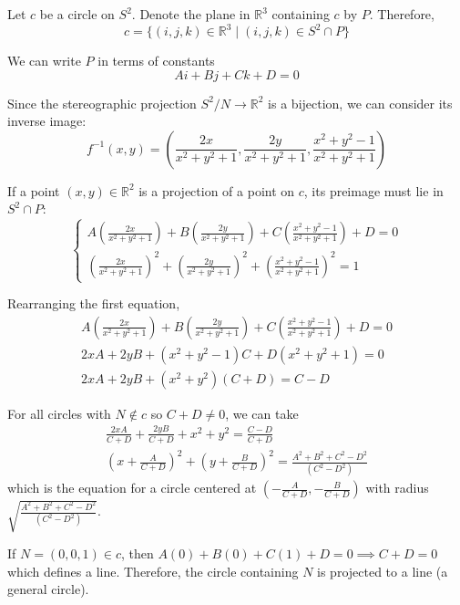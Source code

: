 \documentclass[12pt]{article}
\newcommand{\R}{\mathbb{R}}
\begin{document}
    \color{blue}
        Let $c$ be a circle on $S^2$. Denote the plane in $\R^3$ containing $c$ by $P$. Therefore, 
        \[c = \{(i, j, k) \in \R^3 \; | \; (i, j, k) \in S^2 \cap P\}\]

        We can write $P$ in terms of constants 
        \[Ai + Bj + Ck + D = 0\]

        Since the stereographic projection $S^2/N \to \R^2$ is a bijection, we can consider its inverse image: 
        \[f^{-1}(x, y) = \left(\frac{2x}{x^2 + y^2 + 1}, \frac{2y}{x^2 + y^2 + 1}, \frac{x^2 + y^2 - 1}{x^2 + y^2 + 1}\right)\] 

        If a point $(x, y) \in \R^2$ is a projection of a point on $c$, its preimage must lie in $S^2 \cap P$: 
        \[\begin{cases}
            A\left(\frac{2x}{x^2 + y^2 + 1}\right) + B\left(\frac{2y}{x^2 + y^2 + 1}\right) + C\left(\frac{x^2 + y^2 - 1}{x^2 + y^2 + 1}\right) + D =0\\ 
            \left(\frac{2x}{x^2 + y^2 + 1}\right)^2 + \left(\frac{2y}{x^2 + y^2 + 1}\right)^2 + \left(\frac{x^2 + y^2 - 1}{x^2 + y^2 + 1}\right)^2 = 1
        \end{cases}\]

        Rearranging the first equation,
        \begin{gather*}
            A\left(\frac{2x}{x^2 + y^2 + 1}\right) + B\left(\frac{2y}{x^2 + y^2 + 1}\right) + C\left(\frac{x^2 + y^2 - 1}{x^2 + y^2 + 1}\right) + D =0\\ 
            2xA + 2yB + (x^2 + y^2 - 1)C + D(x^2 + y^2 + 1) = 0\\
            2xA + 2yB + (x^2 + y^2)(C + D) = C - D
        \end{gather*}

        For all circles with $N \notin c$ so $C + D \neq 0$, we can take 
        \begin{gather*}
            \frac{2xA}{C + D} + \frac{2yB}{C + D} + x^2 + y^2 = \frac{C - D}{C + D}\\ 
            \left(x + \frac{A}{C + D}\right)^2 + \left(y + \frac{B}{C  +D}\right)^2 = \frac{A^2 + B^2 + C^2 - D^2}{(C^2 - D^2)}
        \end{gather*}
        which is the equation for a circle centered at $\left(-\frac{A}{C + D}, -\frac{B}{C + D}\right)$ with radius $\sqrt{\frac{A^2 + B^2 + C^2 - D^2}{(C^2 - D^2)}}$.

        If $N = (0, 0, 1) \in c$, then $A(0) + B(0) + C(1) + D = 0 \implies C + D = 0$ which defines a line. Therefore, the circle containing $N$ is projected to a line (a general circle). 
\end{document}
